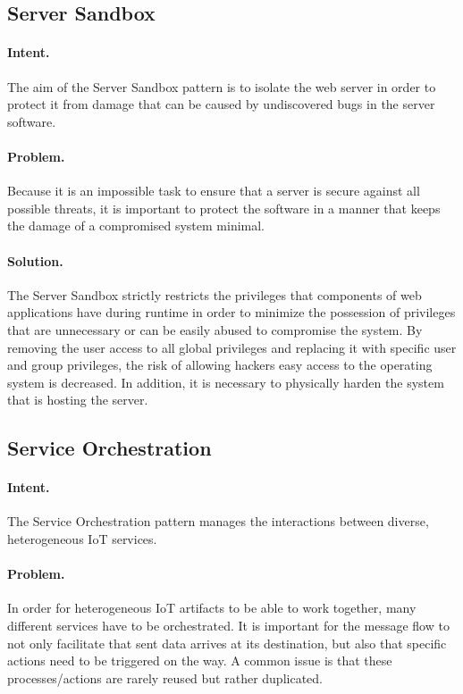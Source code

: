 \subsection{Server Sandbox~\cite{Kienzle2006}} 
\label{p:sandbox}

\paragraph{\textbf{Intent.}} The aim of the Server Sandbox pattern is to isolate the web server in order to protect it from damage that can be caused by undiscovered bugs in the server software.

\paragraph{\textbf{Problem.}} Because it is an impossible task to ensure that a server is secure against all possible threats, it is important to protect the software in a manner that keeps the damage of a compromised system minimal.

\paragraph{\textbf{Solution.}} The Server Sandbox strictly restricts the privileges that components of web applications have during runtime in order to minimize the possession of privileges that are unnecessary or can be easily abused to compromise the system. By removing the user access to all global privileges and replacing it with specific user and group privileges, the risk of allowing hackers easy access to the operating system is decreased. In addition, it is necessary to physically harden the system that is hosting the server. 


\subsection{Service Orchestration~\cite{Tkaczyk2018}} 
\label{p:orchest}

\paragraph{\textbf{Intent.}} The Service Orchestration pattern manages the interactions between diverse, heterogeneous IoT services.

\paragraph{\textbf{Problem.}} In order for heterogeneous IoT artifacts to be able to work together, many different services have to be orchestrated. It is important for the message flow to not only facilitate that sent data arrives at its destination, but also that specific actions need to be triggered on the way. A common issue is that these processes/actions are rarely reused but rather duplicated.  

